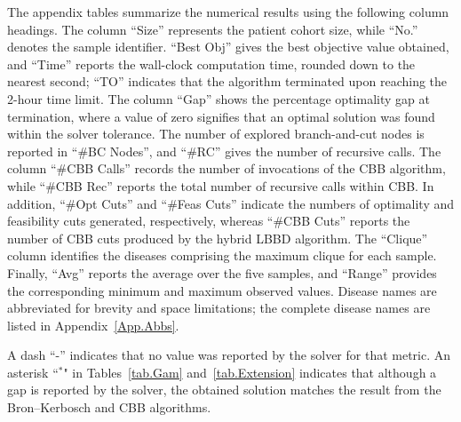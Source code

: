 The appendix tables summarize the numerical results using the following column headings. The column ``Size'' represents the patient cohort size, while ``No.'' denotes the sample identifier. ``Best Obj'' gives the best objective value obtained, and ``Time'' reports the wall-clock computation time, rounded down to the nearest second; ``TO'' indicates that the algorithm terminated upon reaching the 2-hour time limit. The column ``Gap'' shows the percentage optimality gap at termination, where a value of zero signifies that an optimal solution was found within the solver tolerance. The number of explored branch-and-cut nodes is reported in ``\#BC Nodes'', and ``\#RC'' gives the number of recursive calls. The column ``\#CBB Calls'' records the number of invocations of the CBB algorithm, while ``\#CBB Rec'' reports the total number of recursive calls within CBB. In addition, ``\#Opt Cuts'' and ``\#Feas Cuts'' indicate the numbers of optimality and feasibility cuts generated, respectively, whereas ``\#CBB Cuts'' reports the number of CBB cuts produced by the hybrid LBBD algorithm. The ``Clique'' column identifies the diseases comprising the maximum clique for each sample. Finally, ``Avg'' reports the average over the five samples, and ``Range'' provides the corresponding minimum and maximum observed values. Disease names are abbreviated for brevity and space limitations; the complete disease names are listed in Appendix~\ref{App.Abbs}.

A dash ``-'' indicates that no value was reported by the solver for that metric. An asterisk ``$^{*}$" in Tables~\ref{tab.Gam} and~\ref{tab.Extension} indicates that although a gap is reported by the solver, the obtained solution matches the result from the Bron--Kerbosch and CBB algorithms.


